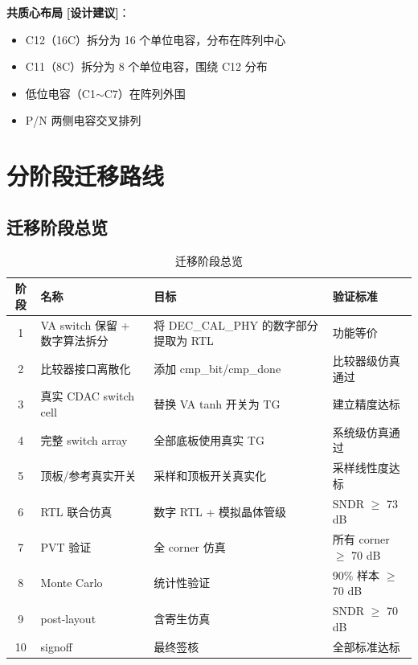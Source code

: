 \documentclass[UTF8,a4paper,11pt]{ctexart}
\newcommand{\suggested}{\textcolor{suggestblue}{\textbf{[设计建议]}}}
\begin{document}
\textbf{共质心布局} \suggested：
\begin{itemize}[leftmargin=2em]
\item C12（16C）拆分为 16 个单位电容，分布在阵列中心
\item C11（8C）拆分为 8 个单位电容，围绕 C12 分布
\item 低位电容（C1$\sim$C7）在阵列外围
\item P/N 两侧电容交叉排列
\end{itemize}

\section{分阶段迁移路线}

\subsection{迁移阶段总览}

\begin{table}[H]
\centering
\caption{迁移阶段总览}
\label{tab:migration-overview}
\small
\begin{tabular}{clp{3.5cm}p{3.5cm}}
\toprule
阶段 & 名称 & 目标 & 验证标准 \\
\midrule
1  & VA switch 保留 + 数字算法拆分 & 将 DEC\_CAL\_PHY 的数字部分提取为 RTL & 功能等价 \\
2  & 比较器接口离散化 & 添加 cmp\_bit/cmp\_done & 比较器级仿真通过 \\
3  & 真实 CDAC switch cell & 替换 VA tanh 开关为 TG & 建立精度达标 \\
4  & 完整 switch array & 全部底板使用真实 TG & 系统级仿真通过 \\
5  & 顶板/参考真实开关 & 采样和顶板开关真实化 & 采样线性度达标 \\
6  & RTL 联合仿真 & 数字 RTL + 模拟晶体管级 & SNDR $\geq$ 73 dB \\
7  & PVT 验证 & 全 corner 仿真 & 所有 corner $\geq$ 70 dB \\
8  & Monte Carlo & 统计性验证 & 90\% 样本 $\geq$ 70 dB \\
9  & post-layout & 含寄生仿真 & SNDR $\geq$ 70 dB \\
10 & signoff & 最终签核 & 全部标准达标 \\
\bottomrule
\end{tabular}
\end{table}
\end{document}
